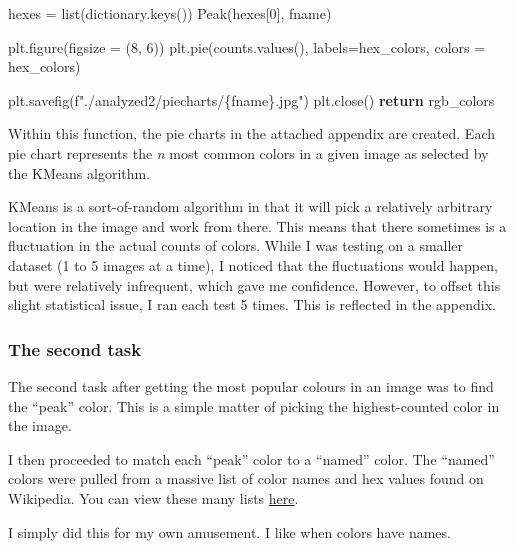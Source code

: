 \documentclass[11pt]{article}
\newenvironment{Shaded}{}{}
\newcommand{\DecValTok}[1]{\textcolor[rgb]{0.25,0.63,0.44}{{#1}}}
\newcommand{\NormalTok}[1]{{#1}}
\newcommand{\SpecialCharTok}[1]{\textcolor[rgb]{0.25,0.44,0.63}{{#1}}}
\newcommand{\SpecialStringTok}[1]{\textcolor[rgb]{0.73,0.40,0.53}{{#1}}}
\newcommand{\ControlFlowTok}[1]{\textcolor[rgb]{0.00,0.44,0.13}{\textbf{{#1}}}}
\newcommand{\OperatorTok}[1]{\textcolor[rgb]{0.40,0.40,0.40}{{#1}}}
\newcommand{\BuiltInTok}[1]{{#1}}
\begin{document}
\begin{Shaded}
\begin{Highlighting}[]
\NormalTok{        hexes }\OperatorTok{=} \BuiltInTok{list}\NormalTok{(dictionary.keys())}
\NormalTok{        Peak(hexes[}\DecValTok{0}\NormalTok{], fname)}

\NormalTok{        plt.figure(figsize }\OperatorTok{=}\NormalTok{ (}\DecValTok{8}\NormalTok{, }\DecValTok{6}\NormalTok{))}
\NormalTok{        plt.pie(counts.values(), labels}\OperatorTok{=}\NormalTok{hex_colors, colors }\OperatorTok{=}\NormalTok{ hex_colors)}
            
\NormalTok{        plt.savefig(}\SpecialStringTok{f"./analyzed2/piecharts/}\SpecialCharTok{\{}\NormalTok{fname}\SpecialCharTok{\}}\SpecialStringTok{.jpg"}\NormalTok{)}
\NormalTok{        plt.close()}
        \ControlFlowTok{return}\NormalTok{ rgb_colors}
\end{Highlighting}
\end{Shaded}

Within this function, the pie charts in the attached appendix are
created. Each pie chart represents the \emph{n} most common colors in a
given image as selected by the KMeans algorithm.

KMeans is a sort-of-random algorithm in that it will pick a relatively
arbitrary location in the image and work from there. This means that
there sometimes is a fluctuation in the actual counts of colors. While I
was testing on a smaller dataset (1 to 5 images at a time), I noticed
that the fluctuations would happen, but were relatively infrequent,
which gave me confidence. However, to offset this slight statistical
issue, I ran each test 5 times. This is reflected in the appendix.

\hypertarget{the-second-task}{%
\subsubsection{The second task}\label{the-second-task}}

The second task after getting the most popular colours in an image was
to find the ``peak'' color. This is a simple matter of picking the
highest-counted color in the image.

I then proceeded to match each ``peak'' color to a ``named'' color. The
``named'' colors were pulled from a massive list of color names and hex
values found on Wikipedia. You can view these many lists
\href{https://en.wikipedia.org/wiki/Lists_of_colors}{here}.

I simply did this for my own amusement. I like when colors have names.
\end{document}
